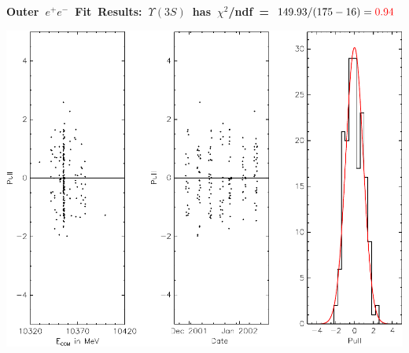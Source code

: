 \documentclass[landscape]{article}
\newenvironment{slide}[1][ ]{\mbox{\boldmath \bf #1 } \vfill}{\vfill \mbox{ } \pagebreak}
\begin{document}
\begin{slide}[Outer $e^+e^-$ Fit Results: $\Upsilon(3S)$ has $\chi^2$/ndf = $149.93/(175-16) = {\color{red} 0.94}$]

\vfill

\vfill
\begin{center}
  \includegraphics[width=0.8\linewidth]{octoberfits_fixen_2_10_pulls3}
\end{center}

\end{slide}
\end{document}
